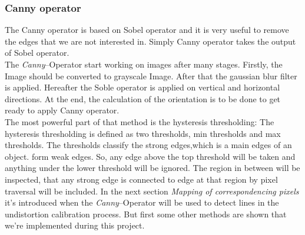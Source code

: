 \documentclass[journal,final,a4paper,twoside]{PS}
\begin{document}
\subsubsection{Canny operator}
The Canny operator is based on Sobel operator and it is very useful to remove the edges that we are not interested in.  Simply Canny operator takes the output of Sobel operator. 
\\
The \emph{Canny}--Operator start working on images after many stages. Firstly, the Image should be converted to grayscale Image. After that the gaussian blur filter is applied.   Hereafter the Soble operator is applied on vertical and horizontal directions. At the end, the calculation of the orientation is to be done to get ready to apply Canny operator.
\\
The most powerful part of that method is the hysteresis thresholding: The hysteresis thresholding is defined as two thresholds, min thresholds and max thresholds. The thresholds classify the strong edges,which is a main edges of an object. form weak edges.  So, any edge above the top threshold will be taken and anything under the lower threshold will be ignored. The region in between will be inspected, that any strong edge is connected to edge at that region by pixel traversal will be included.
In the next section \emph{Mapping of correspondencing pixels} it's introduced when the \emph{Canny}--Operator will be used to detect lines in the undistortion calibration process. But first some other methods are shown that we're implemented during this project.
\end{document}
